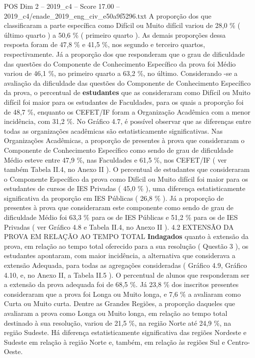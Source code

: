 \begin{textsample}{POS Dim 2 – 2019\_c4 – Score 17.00 – 2019\_c4/enade\_2019\_eng\_civ\_e50a9f5296.txt}
A proporção dos que classificaram a parte específica como Difícil ou Muito difícil variou de 28,0 \% ( último quarto ) a 50,6 \% ( primeiro quarto ).
As demais proporções dessa resposta foram de 47,8 \% e 41,5 \%, nos segundo e terceiro quartos, respectivamente.
Já a proporção dos que responderam que o grau de dificuldade das questões do Componente de Conhecimento Específico da prova foi Médio variou de 46,1 \%, no primeiro quarto a 63,2 \%, no último.
Considerando -se a avaliação da dificuldade das questões do Componente de Conhecimento Específico da prova, o percentual de \textbf{estudantes} que as consideraram como Difícil ou Muito difícil foi maior para os estudantes de Faculdades, para os quais a proporção foi de 48,7 \%, enquanto os CEFET/IF foram a Organização Acadêmica com a menor incidência, com 31,2 \%.
No Gráfico 4.7, é possível observar que as diferenças entre todas as organizações acadêmicas são estatisticamente significativas.
Nas Organizações Acadêmicas, a proporção de presentes à prova que consideraram o Componente de Conhecimento Específico como sendo de grau de dificuldade Médio esteve entre 47,9 \%, nas Faculdades e 61,5 \%, nos CEFET/IF ( ver também Tabela II.4, no Anexo II ).
O percentual de estudantes que consideraram o Componente Específico da prova como Difícil ou Muito difícil foi maior para os estudantes de cursos de IES Privadas ( 45,0 \% ), uma diferença estatisticamente significativa da proporção em IES Públicas ( 26,8 \% ).
Já a proporção de presentes à prova que consideraram este componente como sendo de grau de dificuldade Médio foi 63,3 \% para os de IES Públicas e 51,2 \% para os de IES Privadas ( ver Gráfico 4.8 e Tabela II.4, no Anexo II ). 4.2 EXTENSÃO DA PROVA EM RELAÇÃO AO TEMPO TOTAL \textbf{Indagados} quanto à extensão da prova, em relação ao tempo total oferecido para a sua resolução ( Questão 3 ), os estudantes apontaram, com maior incidência, a alternativa que considerava a extensão Adequada, para todas as agregações consideradas ( Gráfico 4.9, Gráfico 4.10, e, no Anexo II, a Tabela II.5 ).
O percentual de alunos que responderam ser a extensão da prova adequada foi de 68,5 \%.
Já 23,8 \% dos inscritos presentes consideraram que a prova foi Longa ou Muito longa, e 7,6 \% a avaliaram como Curta ou Muito curta.
Dentre as Grandes Regiões, a proporção daqueles que avaliaram a prova como Longa ou Muito longa, em relação ao tempo total destinado à sua resolução, variou de 21,5 \%, na região Norte até 24,9 \%, na região Sudeste.
Há diferença estatisticamente significativa das regiões Nordeste e Sudeste em relação à região Norte e, também, em relação às regiões Sul e Centro-Oeste.

\end{textsample}
